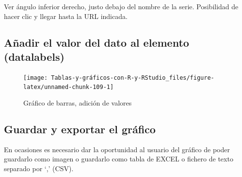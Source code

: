 \documentclass[
]{book}
\newenvironment{Shaded}{\begin{snugshade}}{\end{snugshade}}
\newcommand{\AttributeTok}[1]{\textcolor[rgb]{0.77,0.63,0.00}{#1}}
\newcommand{\ConstantTok}[1]{\textcolor[rgb]{0.00,0.00,0.00}{#1}}
\newcommand{\FunctionTok}[1]{\textcolor[rgb]{0.00,0.00,0.00}{#1}}
\newcommand{\NormalTok}[1]{#1}
\newcommand{\SpecialCharTok}[1]{\textcolor[rgb]{0.00,0.00,0.00}{#1}}
\newcommand{\StringTok}[1]{\textcolor[rgb]{0.31,0.60,0.02}{#1}}
\begin{document}
Ver ángulo inferior derecho, justo debajo del nombre de la serie. Posibilidad de hacer clic y llegar hasta la URL indicada.

\hypertarget{auxf1adir-el-valor-del-dato-al-elemento-datalabels}{%
\subsection{Añadir el valor del dato al elemento (datalabels)}\label{auxf1adir-el-valor-del-dato-al-elemento-datalabels}}

\begin{Shaded}
\end{Shaded}

\begin{figure}[H]

{\centering \texttt{[image: Tablas-y-gráficos-con-R-y-RStudio\_files/figure-latex/unnamed-chunk-109-1]} 

}

\caption{Gráfico de barras, adición de valores}\label{fig:unnamed-chunk-109}
\end{figure}

\hypertarget{guardar-y-exportar-el-gruxe1fico}{%
\subsection{Guardar y exportar el gráfico}\label{guardar-y-exportar-el-gruxe1fico}}

En ocasiones es necesario dar la oportunidad al usuario del gráfico de poder guardarlo como imagen o guardarlo como tabla de EXCEL o fichero de texto separado por `,' (CSV).
\end{document}
